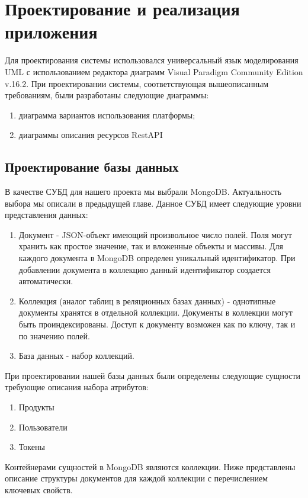 \section{Проектирование и реализация приложения}
Для проектирования системы использовался универсальный язык моделирования UML с использованием редактора диаграмм Visual Paradigm Community Edition v.16.2\cite{7}. При проектировании системы, соответствующая вышеописанным требованиям, были разработаны следующие диаграммы:

\begin{enumerate}
	\item диаграмма вариантов использования платформы;
	\item диаграммы описания ресурсов RestAPI 
\end{enumerate}

\subsection{Проектирование базы данных}

В качестве СУБД для нашего проекта мы выбрали MongoDB. Актуальность выбора мы описали в предыдущей главе. Данное СУБД имеет следующие уровни представления данных:
\begin{enumerate}
	\item Документ - JSON-объект имеющий произвольное число полей. Поля могут хранить как простое значение, так и вложенные объекты и массивы. Для каждого документа в MongoDB определен уникальный идентификатор. При добавлении документа в коллекцию данный идентификатор создается автоматически.
	\item Коллекция (аналог таблиц в реляционных базах данных) - однотипные документы хранятся в отдельной коллекции. Документы в коллекции могут быть проиндексированы. Доступ к документу возможен как по ключу, так и по значению полей.
	\item База данных - набор коллекций.
\end{enumerate}

При проектировании нашей базы данных были определены следующие сущности требующие описания набора атрибутов:

\begin{enumerate}
	\item Продукты
	\item Пользователи
	\item Токены
\end{enumerate}

Контейнерами сущностей  в MongoDB являются коллекции. Ниже представлены описание структуры документов для каждой коллекции с перечислением ключевых свойств.



